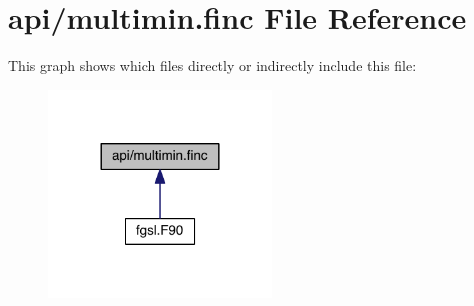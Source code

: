 \hypertarget{multimin_8finc}{\section{api/multimin.finc File Reference}
\label{multimin_8finc}
}
This graph shows which files directly or indirectly include this file\-:
\nopagebreak
\begin{figure}[H]
\begin{center}
\leavevmode
\includegraphics[width=168pt]{multimin_8finc__dep__incl}
\end{center}
\end{figure}
